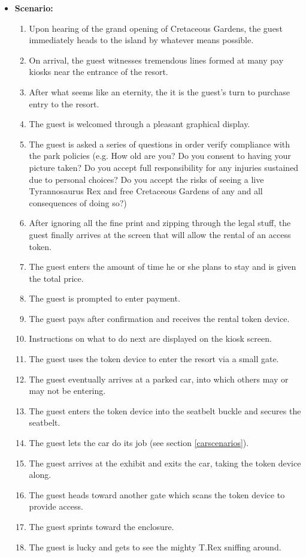 \documentclass[12pt]{article}
\begin{document}
\begin{itemize}
        \item[]\textbf{Scenario:}
            \begin{enumerate}
                \item Upon hearing of the grand opening of Cretaceous Gardens, the guest immediately
                heads to the island by whatever means possible.
                \item On arrival, the guest witnesses tremendous lines formed at many pay kiosks
                near the entrance of the resort.
                \item After what seems like an eternity, the it is the guest's turn to purchase entry to the resort.
                \item The guest is welcomed through a pleasant graphical display.
                \item The guest is asked a series of questions in order verify compliance with the park policies
                (e.g. How old are you? Do you consent to having your picture taken? Do you accept full responsibility 
                for any injuries sustained due to personal choices? Do you accept the risks of seeing a live 
                Tyrannosaurus Rex and free Cretaceous Gardens of any and all consequences of doing so?)
                \item After ignoring all the fine print and zipping through the legal stuff, the guest finally
                arrives at the screen that will allow the rental of an access token.
                \item The guest enters the amount of time he or she plans to stay and is given the total price.
                \item The guest is prompted to enter payment.
                \item The guest pays after confirmation and receives the rental token device.
                \item Instructions on what to do next are displayed on the kiosk screen.
                \item The guest uses the token device to enter the resort via a small gate.
                \item The guest eventually arrives at a parked car, into which others may or may not be entering.
                \item The guest enters the token device into the seatbelt buckle and secures the seatbelt.
                \item The guest lets the car do its job (see section \ref{carscenarios}).
                \item The guest arrives at the exhibit and exits the car, taking the token device along.
                \item The guest heads toward another gate which scans the token device to provide access.
                \item The guest sprints toward the enclosure.
                \item The guest is lucky and gets to see the mighty T.Rex sniffing around. 
            \end{enumerate}


\end{itemize}
\end{document}
